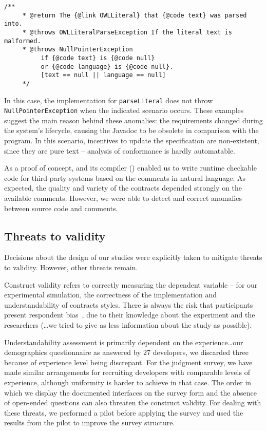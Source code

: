 \begin{lstlisting}[basicstyle=\footnotesize\ttfamily,name=figxpi, frame=lines, mathescape=true]
 /**
     * @return The {@link OWLLiteral} that {@code text} was parsed into.
     * @throws OWLLiteralParseException If the literal text is malformed.
     * @throws NullPointerException 
          if {@code text} is {@code null} 
          or {@code language} is {@code null}. 
          [text == null || language == null]
     */
\end{lstlisting}

In this case, the implementation for \texttt{parseLiteral} does not throw \texttt{NullPointerException} when the indicated scenario occurs.
These examples suggest the main reason behind these anomalies: the requirements changed during the system's lifecycle, causing the Javadoc to be obsolete in comparison with the program. In this scenario, incentives to update the specification are non-existent, since they are pure text -- analysis of conformance is hardly automatable. 

As a proof of concept, \contractjdoc{} and its compiler (\contractjdocCompiler{}) enabled us to write runtime
checkable code for third-party systems based on the comments in natural language.
As expected, the quality and variety of the contracts depended strongly on the available comments. However, we were able to
detect and correct anomalies between source code and comments.

\subsection{Threats to validity}
\label{sec:CaseStudyThreats}

Decisions about the design of our studies were explicitly taken to mitigate threats to validity. However, other threats remain.

Construct validity refers to correctly measuring the
dependent variable -- for our experimental simulation, the correctness of the implementation and understandability of contracts styles.
There is always the risk that participants present respondent bias~\cite{refSurvey}, due to their knowledge about the experiment and the researchers (…we tried to give as less information about the study as possible).

Understandability assessment is primarily dependent on the experience…our demographics questionnaire as answered by 27 developers, we discarded three because of experience level being discrepant.
For the judgment survey, we have made similar arrangements for recruiting developers with comparable levels of experience, although uniformity is harder to achieve in that case.
The order in which we display the documented
interfaces on the survey form and the absence of open-ended questions can also threaten the construct validity. For dealing with these threats, we
performed a pilot before applying the survey and used the results from the pilot to improve the survey structure. 

